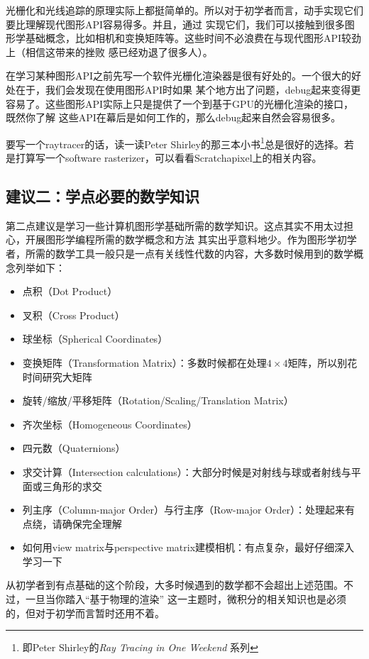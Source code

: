 \documentclass[12pt]{article}
\begin{document}
\indent{}光栅化和光线追踪的原理实际上都挺简单的。所以对于初学者而言，动手实现它们要比理解现代图形API容易得多。并且，通过
实现它们，我们可以接触到很多图形学基础概念，比如相机和变换矩阵等。这些时间不必浪费在与现代图形API较劲上（相信这带来的挫败
感已经劝退了很多人）。

\indent{}在学习某种图形API之前先写一个软件光栅化渲染器是很有好处的。一个很大的好处在于，我们会发现在使用图形API时如果
某个地方出了问题，debug起来变得更容易了。这些图形API实际上只是提供了一个到基于GPU的光栅化渲染的接口，既然你了解
这些API在幕后是如何工作的，那么debug起来自然会容易很多。

\indent{}要写一个raytracer的话，读一读Peter Shirley的那三本小书\footnote{即Peter Shirley的\textit{Ray Tracing in One Weekend}
系列}总是很好的选择。若是打算写一个software rasterizer，可以看看Scratchapixel上的相关内容。

\subsection*{建议二：学点必要的数学知识}
\indent{}第二点建议是学习一些计算机图形学基础所需的数学知识。这点其实不用太过担心，开展图形学编程所需的数学概念和方法
其实出乎意料地少。作为图形学初学者，所需的数学工具一般只是一点有关线性代数的内容，大多数时候用到的数学概念列举如下：
\begin{itemize}
\item 点积（Dot Product）
\item 叉积（Cross Product）
\item 球坐标（Spherical Coordinates）
\item 变换矩阵（Transformation Matrix）：多数时候都在处理$4\times 4$矩阵，所以别花时间研究大矩阵
\item 旋转/缩放/平移矩阵（Rotation/Scaling/Translation Matrix）
\item 齐次坐标（Homogeneous Coordinates）
\item 四元数（Quaternions）
\item 求交计算（Intersection calculations）：大部分时候是对射线与球或者射线与平面或三角形的求交
\item 列主序（Column-major Order）与行主序（Row-major Order）：处理起来有点绕，请确保完全理解
\item 如何用view matrix与perspective matrix建模相机：有点复杂，最好仔细深入学习一下
\end{itemize}
\noindent{}从初学者到有点基础的这个阶段，大多时候遇到的数学都不会超出上述范围。不过，一旦当你踏入“基于物理的渲染”
这一主题时，微积分的相关知识也是必须的，但对于初学而言暂时还用不着。
\end{document}
